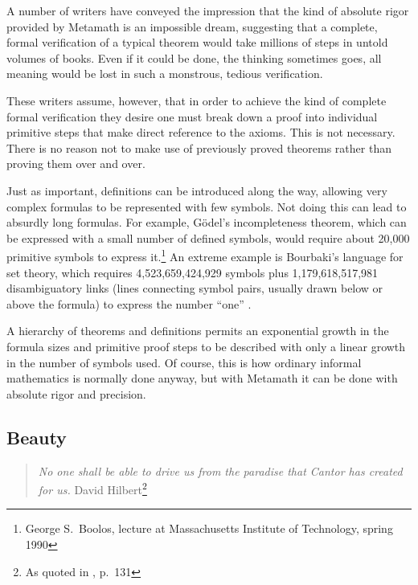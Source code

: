 A number of writers have conveyed the impression that the kind of absolute
rigor provided by Metamath is an impossible dream, suggesting
that a complete, formal verification of a typical theorem
would take millions of steps in untold volumes of books.  Even if it could be
done, the thinking sometimes goes, all meaning would be lost in such a
monstrous, tedious verification.

These writers assume, however, that in order to achieve the kind of complete
formal verification they desire one must break down a proof into individual
primitive steps that make direct reference to the axioms.  This is
not necessary.  There is no reason not to make use of previously proved
theorems rather than proving them over and over.

Just as important, definitions can be introduced along
the way, allowing very complex formulas to be represented with few
symbols.  Not doing this can lead to absurdly long formulas.  For
example, G\"{o}del's incompleteness theorem, which can be expressed with a small number of
defined symbols, would require about 20,000 primitive symbols to express
it.\footnote{George S.\ Boolos, lecture at
Massachusetts Institute of Technology, spring 1990} An extreme example
is Bourbaki's\label{bourbaki} language for set theory, which requires
4,523,659,424,929 symbols plus 1,179,618,517,981 disambiguatory links
(lines connecting symbol pairs, usually drawn below or above the
formula) to express the number
``one'' \cite{Mathias}.

A hierarchy of theorems and definitions permits an
exponential growth in the formula sizes and primitive proof steps to be
described with only a linear growth in the number of symbols used.  Of course,
this is how ordinary informal mathematics is normally done anyway, but with
Metamath it can be done with absolute rigor and precision.

\subsection{Beauty}


\begin{quote}
  {\em No one shall be able to drive us from the paradise that Cantor has
created for us.}
   \flushright\sc  David Hilbert\footnote{As quoted in \cite{Moore}, p.~131}\\
\end{quote}

